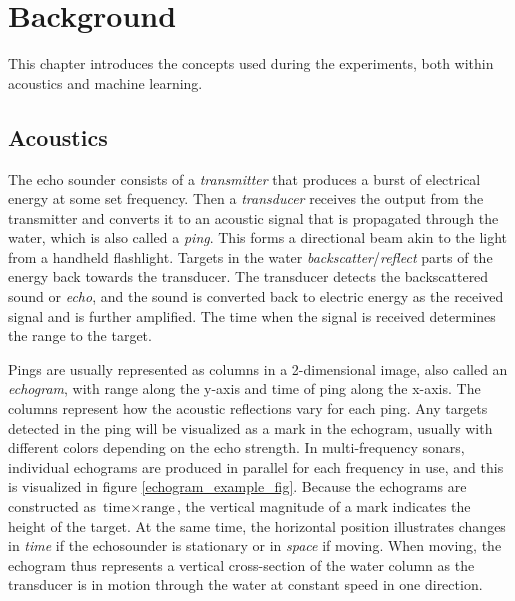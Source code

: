 \chapter{Background}
    This chapter introduces the concepts used during the experiments, both within acoustics and machine learning.
    
    
\section{Acoustics}\label{acoustics}
    
    The echo sounder consists of a \textit{transmitter} that produces a burst of electrical energy at some set frequency. Then a \textit{transducer} receives the output from the transmitter and converts it to an acoustic signal that is propagated through the water, which is also called a \textit{ping}. This forms a directional beam akin to the light from a handheld flashlight. Targets in the water \textit{backscatter}/\textit{reflect} parts of the energy back towards the transducer. The transducer detects the backscattered sound or \textit{echo}, and the sound is converted back to electric energy as the received signal and is further amplified. The time when the signal is received determines the range to the target\cite{simmonds2008fisheries}.
    
    Pings are usually represented as columns in a 2-dimensional image, also called an \textit{echogram}, with range along the y-axis and time of ping along the x-axis. The columns represent how the acoustic reflections vary for each ping. Any targets detected in the ping will be visualized as a mark in the echogram, usually with different colors depending on the echo strength. In multi-frequency sonars, individual echograms are produced in parallel for each frequency in use, and this is visualized in figure \ref{echogram_example_fig}. Because the echograms are constructed as $\text{time} \times \text{range}$, the vertical magnitude of a mark indicates the height of the target. At the same time,  the horizontal position illustrates changes in \textit{time} if the echosounder is stationary or in \textit{space} if moving. When moving, the echogram thus represents a vertical cross-section of the water column as the transducer is in motion through the water at constant speed in one direction\cite{simmonds2008fisheries}.
    
